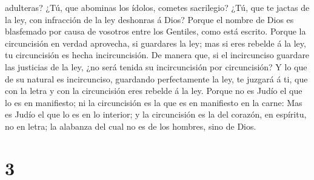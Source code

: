 adulteras? ¿Tú, que abominas los ídolos, cometes sacrilegio?
 ¿Tú, que te jactas de la ley, con infracción de la ley
deshonras á Dios?  Porque el nombre de Dios es blasfemado
por causa de vosotros entre los Gentiles, como está escrito.
 Porque la circuncisión en verdad aprovecha, si guardares
la ley; mas si eres rebelde á la ley, tu circuncisión es hecha
incircuncisión.  De manera que, si el incircunciso
guardare las justicias de la ley, ¿no será tenida su incircuncisión por
circuncisión?  Y lo que de su natural es incircunciso,
guardando perfectamente la ley, te juzgará á ti, que con la letra y con
la circuncisión eres rebelde á la ley.  Porque no es
Judío el que lo es en manifiesto; ni la circuncisión es la que es en
manifiesto en la carne:  Mas es Judío el que lo es en lo
interior; y la circuncisión es la del corazón, en espíritu, no en letra;
la alabanza del cual no es de los hombres, sino de Dios.

\hypertarget{section-2}{%
\section{3}\label{section-2}}

